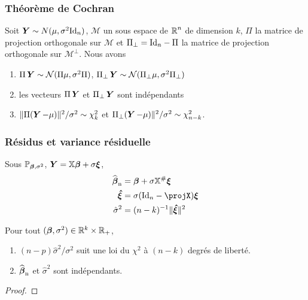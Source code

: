 \begin{frame}
\frametitle{Théorème de Cochran}
\begin{theo}
Soit $\operatorname{\boldsymbol{Y}} \sim N(\mu,\sigma^2 \mathrm{Id}_{n})$, $\mathcal{M}$ un sous espace de $\operatorname{{\mathbb R}}^n$ de dimension $k$, $\Pi$ la matrice de projection orthogonale
sur $\mathcal{M}$ et $\Pi_{\perp}= \mathrm{Id}_{n} - \Pi$ la matrice de projection orthogonale sur $\mathcal{M}^\perp$. Nous avons
\begin{enumerate}
\item \alert<1>{$\Pi \operatorname{\boldsymbol{Y}} \sim \mathcal{N}(\Pi \mu, \sigma^2 \Pi)$, $\Pi_\perp \operatorname{\boldsymbol{Y}} \sim \mathcal{N}(\Pi_{\perp} \mu, \sigma^2 \Pi_{\perp})$}
\item \alert<2>{les vecteurs $\Pi \operatorname{\boldsymbol{Y}}$ et $\Pi_\perp \operatorname{\boldsymbol{Y}}$ sont indépendants}
\item \alert<3>{$\| \Pi(\operatorname{\boldsymbol{Y}} - \mu) \|^2 / \sigma^2 \sim \chi^2_k$ et $\Pi_\perp(\operatorname{\boldsymbol{Y}}-\mu) \|^2/\sigma^2 \sim \chi^2_{n-k}$}.
\end{enumerate}
\end{theo}
\end{frame}

\begin{frame}
\frametitle{Résidus et variance résiduelle}
Sous $\operatorname{{\mathbb P}}_{\boldsymbol{\beta},\sigma^2}$, $\operatorname{\boldsymbol{Y}}= \mathbb{X} \boldsymbol{\beta} +  \sigma \boldsymbol{\xi}$,
\begin{align*}
\estregress    &=  \truebeta + \sigma \regressmat^{\#} \bnoise \\
\errpred       &= \sigma (\Id{n}-\projX) \bnoise \\
\hat{\sigma}^2 &= (n-k)^{-1} \| \errpred \|^2
\end{align*}
\begin{theorem}
Pour tout $(\boldsymbol{\beta},\sigma^2) \in \mathbb{R}^k \times \mathbb{R}_+$,
\begin{enumerate}
\item $(n-p) \hat{\sigma}^2/\sigma^2$ suit une loi du $\chi^2$ à $(n-k)$ degrés de liberté.
\item $\operatorname{\widehat{\boldsymbol{\beta}}_n}$ et $\hat{\sigma}^2$ sont indépendants.
\end{enumerate}
\end{theorem}
\begin{proof}
\end{proof}
\end{frame}


